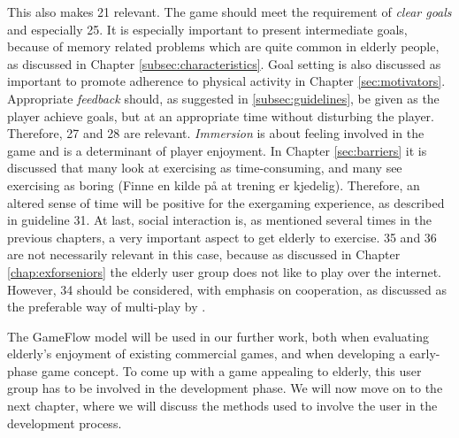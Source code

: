 This also makes 21 relevant. The game should meet the requirement of \emph{clear goals} and especially 25. It is especially important to present intermediate goals, because of memory related problems which are quite common in elderly people, as discussed in Chapter \ref{subsec:characteristics}. Goal setting is also discussed as important to promote adherence to physical activity in Chapter \ref{sec:motivators}. Appropriate \emph{feedback} should, as suggested in \ref{subsec:guidelines}, be given as the player achieve goals, but at an appropriate time without disturbing the player. Therefore, 27 and 28 are relevant. \emph{Immersion} is about feeling involved in the game and is a determinant of player enjoyment. In Chapter \ref{sec:barriers} it is discussed that many look at exercising as time-consuming, and many see exercising as boring (Finne en kilde på at trening er kjedelig). Therefore, an altered sense of time will be positive for the exergaming experience, as described in guideline 31. At last, social interaction is, as mentioned several times in the previous chapters, a very important aspect to get elderly to exercise. 35 and 36 are not necessarily relevant in this case, because as discussed in Chapter \ref{chap:exforseniors} the elderly user group does not like to play over the internet. However, 34 should be considered, with emphasis on cooperation, as discussed as the preferable way of multi-play by \cite{Gajadhar}.

The GameFlow model will be used in our further work, both when evaluating elderly's enjoyment of existing commercial games, and when developing a early-phase game concept. To come up with a game appealing to elderly, this user group has to be involved in the development phase. We will now move on to the next chapter, where we will discuss the methods used to involve the user in the development process.
